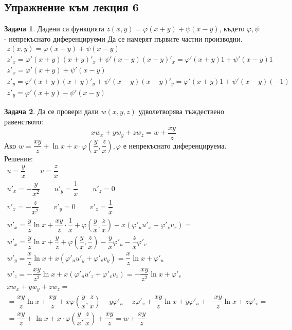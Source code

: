 \documentclass[a4paper,fleqn,12pt]{article}
\theoremstyle{definition}
\newtheorem{task}{Задача}[subsection]
\begin{document}
\subsection{Упражнение към лекция 6}

\begin{task}
Дадени са функцията $z(x,y) = \varphi(x+y) + \psi(x-y)$, където $\varphi, \psi$ - непрекъснато диференцируеми
Да се намерят първите частни производни.
\begin{gather*}
z(x,y) = \varphi(x+y) + \psi(x-y) \\
z'_x = \varphi'(x+y)(x+y)'_x + \psi'(x-y)(x-y)'_x  = \varphi'(x+y)1 + \psi'(x-y)1\\
z'_x = \varphi'(x+y) + \psi'(x-y)\\
z'_y = \varphi'(x+y)(x+y)'_y + \psi'(x-y)(x-y)'_y = \varphi'(x+y)1 + \psi'(x-y)(-1) \\
z'_y = \varphi'(x+y) - \psi'(x-y)
\end{gather*}
\end{task}

\begin{task}
Да се провери дали $w(x,y,z)$ удволетворява тъждествено равенството:
$$x w_x + y w_y+z w_z = w + \dfrac{xy}{z}$$
Ако $w = \dfrac{xy}{z} + \ln{x} + x \cdot \varphi \left(\dfrac{y}{x}, \dfrac{z}{x}\right), \varphi$ е непрекъснато диференцируема.\\
Решение: \\ 
\begin{gather*}
u = \dfrac{y}{x} \qquad v = \dfrac{z}{x}\\
u'_x = - \dfrac{y}{x^2} \qquad u'_y = \dfrac{1}{x} \qquad u'_z = 0 \\
v'_x = - \dfrac{z}{x^2} \qquad v'_y = 0 \qquad v'_z = \dfrac{1}{x} \\
w'_x = \dfrac{y}{z} \ln{x} + \dfrac{xy}{z} \cdot \dfrac{1}{x} + \varphi \left(\dfrac{y}{x}, \dfrac{z}{x}\right) + x(\varphi'_u u'_x + \varphi'_v v_x) =\\
w'_x =\dfrac{y}{z} \ln{x} + \dfrac{y}{z}+ \varphi \left(\dfrac{y}{x}, \dfrac{z}{x}\right) -\dfrac{y}{x}\varphi'_u  - \dfrac{z}{x}\varphi'_v\\
w'_y = \dfrac{x}{z} \ln{x} + x(\varphi'_u u'_y + \varphi'_v v_y) = \dfrac{x}{z} \ln{x} + \varphi'_u \\
w'_z = -\dfrac{xy}{z^2} \ln{x} + x(\varphi'_u u'_z + \varphi'_v v_z) =  -\dfrac{xy}{z^2} \ln{x} + \varphi'_v\\
x w_x + y w_y+z w_z = \\
= \dfrac{xy}{z} \ln{x} + \dfrac{xy}{z}+ x \varphi \left(\dfrac{y}{x}, \dfrac{z}{x}\right) -y\varphi'_u  - z\varphi'_v + \dfrac{xy}{z} \ln{x} + y\varphi'_u + -\dfrac{xy}{z} \ln{x} + z\varphi'_v =\\
= \dfrac{xy}{z} + \ln{x} + x \cdot \varphi \left(\dfrac{y}{x}, \dfrac{z}{x}\right) +\dfrac{xy}{z} = w +\dfrac{xy}{z} 
\end{gather*}
\end{task}
\end{document}
